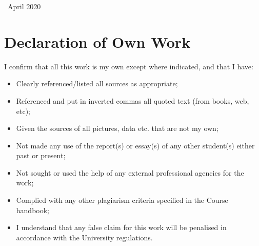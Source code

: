 \documentclass{report}
\begin{document}
\begin{titlepage}
	
	
	\vfill\vfill\vfill %
	
	{\large\ April 2020} %
	
	
	 	
\end{titlepage}
  
  
\onehalfspacing



\newpage
\addtocounter{page}{1}

\chapter*{Declaration of Own Work}

\noindent I confirm that all this work is my own except where indicated, and that I have: \vspace{-0.2cm}

\begin{itemize}
 \item Clearly referenced/listed all sources as appropriate;\vspace{-0.2cm}  
 \item Referenced and put in inverted commas all quoted text (from books, web, etc); \vspace{-0.2cm}
 \item Given the sources of all pictures, data etc. that are not my own;\vspace{-0.2cm}
 \item Not made any use of the report(s) or essay(s) of any other student(s) either past  or present; \vspace{-0.2cm}
 \item Not sought or used the help of any external professional agencies for the work; \vspace{-0.2cm}
 \item Complied with any other plagiarism criteria specified in the Course handbook; \vspace{-0.2cm}
 \item I understand that any false claim for this work will be penalised in accordance with the University regulations. \vspace{-0.2cm}
\end{itemize}
\end{document}
